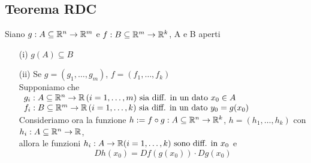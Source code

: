 \subsection{Teorema RDC}
\begin{theorem}
  Siano $g: A \subseteq \mathbb{R}^n\to \mathbb{R}^m$ e $f : B \subseteq \mathbb{R}^m \to \mathbb{R}^k$, A e B aperti
  \begin{enumerate}
    \item[(i)] $g(A) \subseteq B$
    \item[(ii)] Se $g = (g_1, \dots, g_m)$, $f = (f_1, \dots, f_k)$ \\
              Supponiamo che  $\begin{array}{l}
                g_i : A \subseteq \mathbb{R}^n \to \mathbb{R} \, (i = 1,\dots,m) \text{ sia diff. in un dato } x_0 \in A \\
                f_i : B \subseteq \mathbb{R}^m \to \mathbb{R} \, (i = 1,\dots,k) \text{ sia diff. in un dato } y_0 = g(x_0) \\ 
              \end{array}$ \\
              Consideriamo ora la funzione $h:= f \circ g : A \subseteq \mathbb{R}^n \to \mathbb{R}^k$, $h = (h_1, \dots, h_k)$
              con $h_i : A \subseteq \mathbb{R}^n \to \mathbb{R}$, \\ allora le funzioni 
              $h_i : A \to \mathbb{R} (i = 1,\dots,k) \text{ sono diff. in } x_0$ e 
              $$D h(x_0) = D f(g(x_0)) \cdot D g(x_0)$$
  \end{enumerate}
\end{theorem}